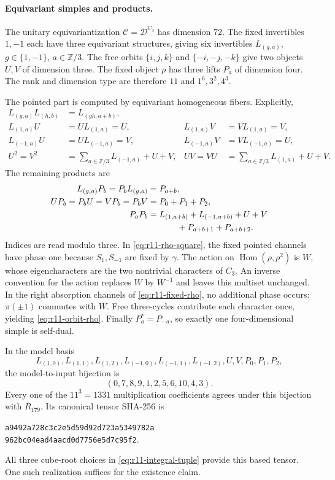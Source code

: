 \paragraph{Equivariant simples and products.}
The unitary equivariantization
$\mathcal C=\mathcal D^{C_3}$ has dimension $72$.
The fixed invertibles $1,-1$ each have three equivariant structures,
giving six invertibles $L_{(g,a)}$, $g\in\{1,-1\}$,
$a\in\mathbb Z/3$. The free orbits
$\{i,j,k\}$ and $\{-i,-j,-k\}$ give two objects $U,V$ of dimension three.
The fixed object $\rho$ has three lifts $P_a$ of dimension four.
The rank and dimension type are therefore $11$ and $1^6,3^2,4^3$.

The pointed part is computed by equivariant homogeneous fibers. Explicitly,
\begin{align*}
 L_{(g,a)}L_{(h,b)}&=L_{(gh,a+b)},\\
 L_{(1,a)}U&=U L_{(1,a)}=U,
 &L_{(1,a)}V&=V L_{(1,a)}=V,\\
 L_{(-1,a)}U&=U L_{(-1,a)}=V,
 &L_{(-1,a)}V&=V L_{(-1,a)}=U,\\
 U^2=V^2&=\sum_{a\in\mathbb Z/3}L_{(-1,a)}+U+V,
 &UV=VU&=\sum_{a\in\mathbb Z/3}L_{(1,a)}+U+V.
\end{align*}
The remaining products are
\begin{align}
 L_{(g,a)}P_b=P_bL_{(g,a)}&=P_{a+b},\label{eq:r11-fixed-rho}\\
 UP_b=P_bU=VP_b=P_bV&=P_0+P_1+P_2,\label{eq:r11-orbit-rho}\\
 P_aP_b&=L_{(1,a+b)}+L_{(-1,a+b)}+U+V\notag\\
 &\hspace{12mm}+P_{a+b+1}+P_{a+b+2}.
 \label{eq:r11-rho-square}
\end{align}
Indices are read modulo three. In \eqref{eq:r11-rho-square}, the fixed
pointed channels have phase one because $S_1,S_{-1}$ are fixed by
$\gamma$. The action on $\operatorname{Hom}(\rho,\rho^2)$ is $W$, whose
eigencharacters are the two nontrivial characters of $C_3$. An inverse
convention for the action replaces $W$ by $W^{-1}$ and leaves this
multiset unchanged. In the right absorption channels of
\eqref{eq:r11-fixed-rho}, no additional phase occurs: $\pi(\pm1)$ commutes
with $W$. Free three-cycles contribute each character once, yielding
\eqref{eq:r11-orbit-rho}. Finally $P_a^*=P_{-a}$, so exactly one
four-dimensional simple is self-dual.

In the model basis
\[
 L_{(1,0)},L_{(1,1)},L_{(1,2)},
 L_{(-1,0)},L_{(-1,1)},L_{(-1,2)},U,V,P_0,P_1,P_2,
\]
the model-to-input bijection is
\begin{equation}\label{eq:r11-179-bijection}
 (0,7,8,9,1,2,5,6,10,4,3).
\end{equation}
Every one of the $11^3=1331$ multiplication coefficients agrees under
this bijection with $R_{179}$. Its canonical tensor SHA-256 is
\begin{center}\small
\texttt{a9492a728c3c2e5d59d92d723a5349782a}\\[-1mm]
\texttt{962bc04ead4aacd0d7756e5d7c95f2}.
\end{center}
All three cube-root choices in \eqref{eq:r11-integral-tuple} provide
this based tensor. One such realization suffices for the existence claim.

